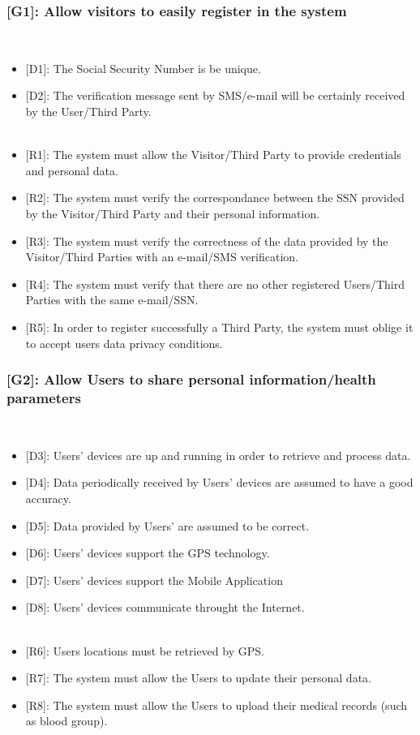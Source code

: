 \documentclass[12pt,a4paper]{article}
\begin{document}
	\subsubsection*{{[}{G1}{]}: Allow visitors to easily register in the system}
	\begin{itemize}\\
		\begin{itemize}
			\item {[D1]}: The Social Security Number is be unique.
			\item {[D2]}: The verification message sent by SMS/e-mail will be certainly received by the User/Third Party.
			\\\\
			\item {[R1]}: The system must allow the Visitor/Third Party to provide credentials and personal data.
			\item {[R2]}: The system must verify the correspondance between the SSN provided by the Visitor/Third Party and their personal information.
			\item {[R3]}: The system must verify the correctness of the data provided by the Visitor/Third Parties with an e-mail/SMS verification.
			\item {[R4]}: The system must verify that there are no other registered Users/Third Parties with the same e-mail/SSN.
			\item {[R5]}: In order to register successfully a Third Party, the system must oblige it to accept users data privacy conditions.
		\end{itemize} 
	\end{itemize}
	\subsubsection*{{[}{G2}{]}: Allow Users to share personal information/health parameters}
	\begin{itemize}\\
		\begin{itemize}
			\item {[D3]}: Users' devices are up and running in order to retrieve and process data.
			\item {[D4]}: Data periodically received by Users' devices are assumed to have a good accuracy.
			\item {[D5]}: Data provided by Users' are assumed to be correct. 
			\item {[D6]}: Users' devices support the GPS technology.
			\item {[D7]}: Users' devices support the Mobile Application 
			\item {[D8]}: Users' devices communicate throught the Internet.
			\\ \\
			\item {[R6]}: Users locations must be retrieved by GPS.
			\item {[R7]}: The system must allow the Users to update their personal data.
			\item {[R8]}: The system must allow the Users to upload their medical records (such as blood group).
		\end{itemize} 
	\end{itemize}
\end{document}
